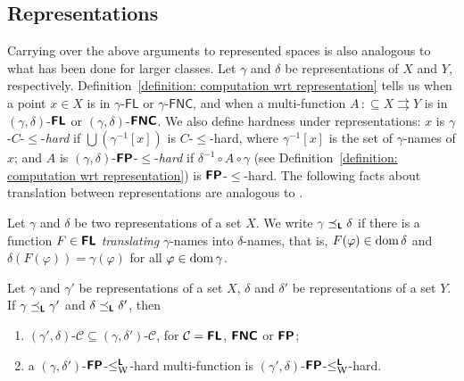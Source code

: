 \documentclass[envcountsect,envcountsame,orivec,oribibl]{llncs}
\newcommand{\classonefont}[1]{\mathsf{#1}}
\newcommand{\classFL}{\classonefont{FL}}
\newcommand{\classFNC}{\classonefont{FNC}}
\newcommand{\classtwofont}[1]{\text{\bfseries \sffamily \upshape #1}}
\newcommand{\classLtwo}{\classtwofont{L}}
\newcommand{\classFLtwo}{\classtwofont{FL}}
\newcommand{\classFNCtwo}{\classtwofont{FNC}}
\newcommand{\classFPtwo}{\classtwofont{FP}}
\newcommand{\redW}{\leq _{\mathrm W}}
\newcommand{\redmF}{\leq _{\mathrm{mF}}}
\newcommand{\redLW}{\redW ^{\classLtwo}}
\newcommand{\redLmF}{\redmF ^{\classLtwo}}
\newcommand{\probCVPtwo}{\mathrm{CVP}^2}
\newcommand{\dom}{\mathop{\rm dom}}
\newcommand{\pcolon}{\mathpunct{\,:\subseteq}}
\begin{document}


\subsection{Representations}
\newcommand{\transL}{\preceq_\classLtwo}

Carrying over the above arguments to represented spaces
is also analogous to what has been done \cite{kawamura2012complexity} for larger classes. 
Let $\gamma$ and $\delta$ be representations of $X$ and $Y$, respectively.
Definition~\ref{definition: computation wrt representation} 
tells us when 
a point $x \in X$ is in $\gamma$-$\classFL$ or $\gamma$-$\classFNC$, 
and when a multi-function $A \pcolon X \rightrightarrows Y$ is in
$(\gamma, \delta)$-$\classFLtwo$ or
$(\gamma, \delta)$-$\classFNCtwo$. 
We also define hardness under representations: 
$x$ is $\gamma$-$C$-$\le$-\emph{hard} if
$\bigcup(\gamma^{-1}[x])$ is $C$-$\le$-hard,
where $\gamma^{-1}[x]$ is the set of $\gamma$-names of $x$; 
and $A$ is $(\gamma, \delta)$-$\classFPtwo$-$\le$-\emph{hard}
if $\delta^{-1} \circ A \circ \gamma$ 
(see Definition~\ref{definition: computation wrt representation}) 
is $\classFPtwo$-$\le$-hard.
The following facts
about translation between representations are
analogous to \cite{kawamura2012complexity}. 

\begin{definition}
Let $\gamma$ and $\delta$ be two representations of a set $X$.
We write $\gamma \transL \delta$ if
there is a function $F \in \classFLtwo$ \emph{translating} $\gamma$-names
into $\delta$-names, that is, 
$F (\varphi) \in \dom \delta$ and $\delta(F(\varphi)) = \gamma (\varphi)$ 
for all $\varphi \in \dom \gamma$.
\end{definition}

\begin{lemma}
 Let $\gamma$ and $\gamma'$ be representations of a set $X$, 
 $\delta$ and $\delta'$ be representations of a set $Y$.
 If $\gamma \transL \gamma'$ and $\delta \transL \delta'$, then 
\begin{enumerate}
\item 
$(\gamma', \delta)$-$\mathcal C \subseteq (\gamma, \delta')$-$\mathcal C$, 
for $\mathcal{C} = \classFLtwo$, $\classFNCtwo$ or $\classFPtwo$; 
\item 
a $(\gamma, \delta')$-$\classFPtwo$-$\redLW$-hard multi-function is
$(\gamma', \delta)$-$\classFPtwo$-$\redLW$-hard.
\end{enumerate}
\end{lemma}
\end{document}

